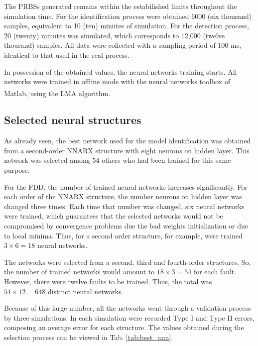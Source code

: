 \documentclass[10pt,fleqn,a4paper]{article}
\newcommand{\reg}{\textsuperscript{\textregistered}}
\begin{document}
The PRBSs generated remains within the estabilished limits throughout the
simulation time. For the identification process were obtained 6000 (six
thousand) samples, equivalent to 10 (ten) minutes of simulation. For the
detection process, 20 (twenty) minutes was simulated, which corresponds to
12,000 (twelve thousand) samples. All data were collected with a sampling period
of 100 ms, identical to that used in the real process.

In possession of the obtained values, the neural networks training starts. All
networks were trained in offline mode with the neural networks toolbox of
Matlab\reg, using the LMA algorithm.

\subsection{Selected neural structures}
As already seen, the best network used for the model identification was obtained
from a second-order NNARX structure with eight neurons on hidden layer. This
network was selected among 54 others who had been trained for this same purpose.

For the FDD, the number of trained neural networks increases significantly. For
each order of the NNARX structure, the number neurons on hidden layer was
changed three times. Each time that number was changed, six neural networks were
trained, which guarantees that the selected networks would not be compromised by
convergence problems due the bad weights initialization or due to local minima.
Thus, for a second order structure, for example, were trained $3 \times 6 = 18$
neural networks.

The networks were selected from a second, third and fourth-order structures. So,
the number of trained networks would amount to $18 \times 3 = 54$ for each
fault. However, there were twelve faults to be trained. Thus, the total was $54
\times 12 = 648$ distinct neural networks.

Because of this large number, all the networks went through a validation process
by three simulations. In each simulation were recorded Type I and Type II
errors, composing an average error for each structure. The values obtained
during the selection process can be viewed in Tab. \ref {tab:best_ann}.
\end{document}
